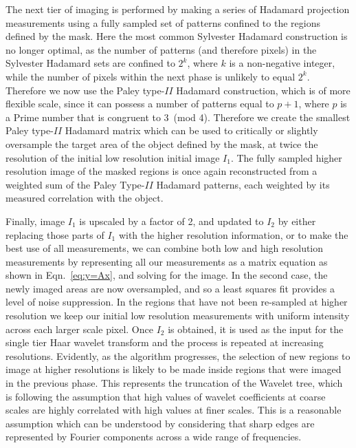 The next tier of imaging is performed by making a series of Hadamard projection measurements using a fully sampled set of patterns confined to the regions defined by the mask. Here the most common Sylvester Hadamard construction is no longer optimal, as the number of patterns (and therefore pixels) in the Sylvester Hadamard sets are confined to $2^k$, where $k$ is a non-negative integer, while the number of pixels within the next phase is unlikely to equal $2^k$. Therefore we now use the Paley type-$II$ Hadamard construction, which is of more flexible scale, since it can possess a number of patterns equal to $p+1$, where $p$ is a Prime number that is congruent to 3~(mod 4). Therefore we create the smallest Paley type-$II$ Hadamard matrix which can be used to critically or slightly oversample the target area of the object defined by the mask, at twice the resolution of the initial low resolution initial image $I_1$. The fully sampled higher resolution image of the masked regions is once again reconstructed from a weighted sum of the Paley Type-$II$ Hadamard patterns, each weighted by its measured correlation with the object.

Finally, image $I_1$ is upscaled by a factor of 2, and updated to $I_2$ by either replacing those parts of $I_1$ with the higher resolution information, or to make the best use of all measurements, we can combine both low and high resolution measurements by representing all our measurements as a matrix equation as shown in Eqn.~\eqref{eq:y=Ax}, and solving for the image. In the second case, the newly imaged areas are now oversampled, and so a least squares fit provides a level of noise suppression. In the regions that have not been re-sampled at higher resolution we keep our initial low resolution measurements with uniform intensity across each larger scale pixel. Once $I_2$ is obtained, it is used as the input for the single tier Haar wavelet transform and the process is repeated at increasing resolutions. Evidently, as the algorithm progresses, the selection of new regions to image at higher resolutions is likely to be made inside regions that were imaged in the previous phase. This represents the truncation of the Wavelet tree, which is following the assumption that high values of wavelet coefficients at coarse scales are highly correlated with high values at finer scales. This is a reasonable assumption which can be understood by considering that sharp edges are represented by Fourier components across a wide range of frequencies.


